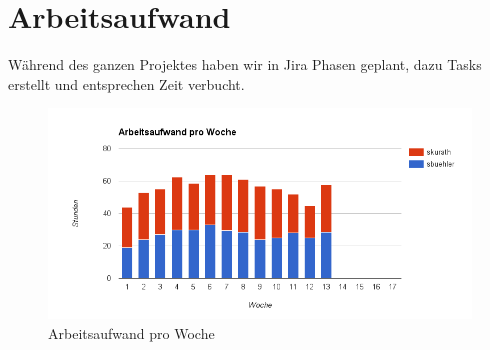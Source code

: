 \section{Arbeitsaufwand}
Während des ganzen Projektes haben wir in Jira Phasen geplant, dazu Tasks erstellt und entsprechen Zeit verbucht.

\begin{figure}[H]
	\centering
	\includegraphics[width=480pt]{images/arbeits_aufwand_pro_woch.png}
	\caption{Arbeitsaufwand pro Woche}
\end{figure}

\newpage